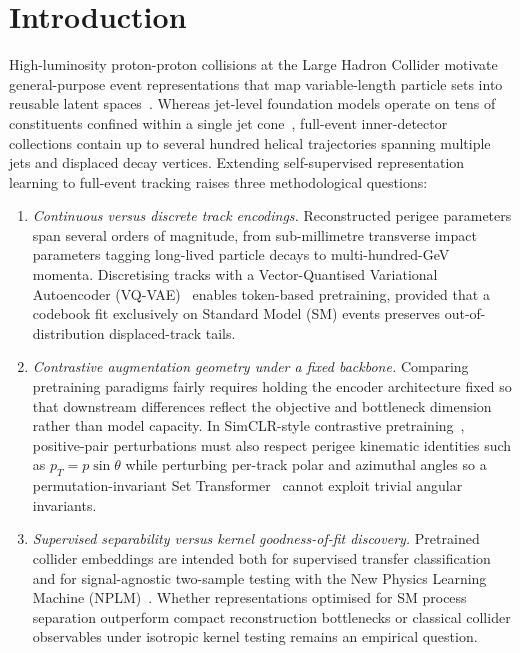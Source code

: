 \documentclass{article}
\begin{document}
\section{Introduction}
\label{sec:intro}

High-luminosity proton-proton collisions at the Large Hadron Collider motivate general-purpose event representations that map variable-length particle sets into reusable latent spaces~\cite{JetCLR,ResimulationSSL,OmniJetAlpha,OmniLearn,MPM,BinnedTokenizationHEP}. Whereas jet-level foundation models operate on tens of constituents confined within a single jet cone~\cite{ParT,OmniJetAlpha,OmniLearn,MPM}, full-event inner-detector collections contain up to several hundred helical trajectories spanning multiple jets and displaced decay vertices. Extending self-supervised representation learning to full-event tracking raises three methodological questions:
\begin{enumerate}
    \item \emph{Continuous versus discrete track encodings.} Reconstructed perigee parameters span several orders of magnitude, from sub-millimetre transverse impact parameters tagging long-lived particle decays to multi-hundred-GeV momenta. Discretising tracks with a Vector-Quantised Variational Autoencoder (VQ-VAE)~\cite{VQVAE} enables token-based pretraining, provided that a codebook fit exclusively on Standard Model (SM) events preserves out-of-distribution displaced-track tails.
    \item \emph{Contrastive augmentation geometry under a fixed backbone.} Comparing pretraining paradigms fairly requires holding the encoder architecture fixed so that downstream differences reflect the objective and bottleneck dimension rather than model capacity. In SimCLR-style contrastive pretraining~\cite{SimCLR,JetCLR}, positive-pair perturbations must also respect perigee kinematic identities such as $p_T = p\sin\theta$ while perturbing per-track polar and azimuthal angles so a permutation-invariant Set Transformer~\cite{SetTransformer} cannot exploit trivial angular invariants.
    \item \emph{Supervised separability versus kernel goodness-of-fit discovery.} Pretrained collider embeddings are intended both for supervised transfer classification and for signal-agnostic two-sample testing with the New Physics Learning Machine (NPLM)~\cite{NPLM2019,NPLM2021,KernelNPLM2022,NPLMEmbedding2025}. Whether representations optimised for SM process separation outperform compact reconstruction bottlenecks or classical collider observables under isotropic kernel testing remains an empirical question.
\end{enumerate}
\end{document}
